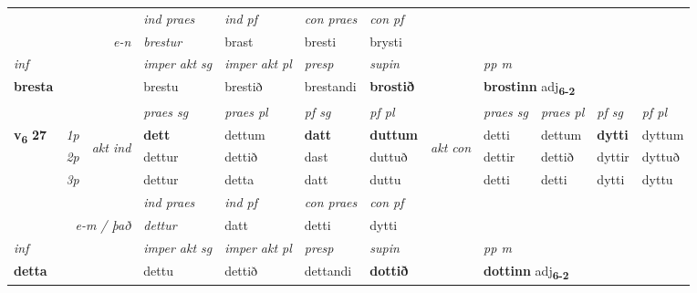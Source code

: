 \begin{longtable}[l]{X>{\footnotesize\itshape}llXXXXlXXXX}
   && &  \textit{ind praes} & \textit{ind pf} & \textit{con praes} & \textit{con pf} \\*
\multicolumn{3}{r}{\textit{e-n}} & brestur & brast & bresti & brysti \\*

\cmidrule{4-7}
   {\textit{inf}} & &  & \textit{imper akt sg} & \textit{imper akt pl}   & \textit{presp} & \textit{supin}  && \textit{pp m} \\*
  {\textbf{bresta}} & && brestu  & brestið   & brestandi &  \textbf{brostið}  && \multicolumn{2}{l}{\textbf{brostinn} adj\textbf{\textsubscript{6-2}}} \\*

\midrule

 & &   & \textit{praes sg}  & \textit{praes pl}    & \textit{ pf sg} & \textit{pf pl} & & \textit{praes sg}  & \textit{praes pl}    & \textit{pf sg} & \textit{pf pl }  \\ \cmidrule{4-7} \cmidrule{9-12}
 \multirow{2}{*}{{{\textbf{v{\textsubscript{6}}} \Large{\textbf{27}}}}}  & 1p & \multirow{3}{*}{\begin{turn}{90}\textit{akt ind}\end{turn}} & \textbf{dett} & dettum & \textbf{datt} & \textbf{duttum} & \multirow{3}{*}{\begin{turn}{90}\textit{akt con}\end{turn}} &detti & dettum & \textbf{dytti} & dyttum\\*
 & 2p &  &  dettur  & dettið & dast & duttuð & & dettir & dettið & dyttir & dyttuð \\*
 & 3p &  & dettur & detta & datt & duttu & & detti & detti& dytti & dyttu \\*
\cmidrule{4-7} \cmidrule{9-12}

   && &  \textit{ind praes} & \textit{ind pf} & \textit{con praes} & \textit{con pf} \\*
\multicolumn{3}{r}{\textit{e-m / það}} & dettur & datt & detti & dytti \\*

\cmidrule{4-7}
   {\textit{inf}} & &  & \textit{imper akt sg} & \textit{imper akt pl}   & \textit{presp} & \textit{supin}  && \textit{pp m} \\*
  {\textbf{detta}} & && dettu  & dettið   & dettandi &  \textbf{dottið}  && \multicolumn{2}{l}{\textbf{dottinn} adj\textbf{\textsubscript{6-2}}} \\*

\midrule


\end{longtable}
